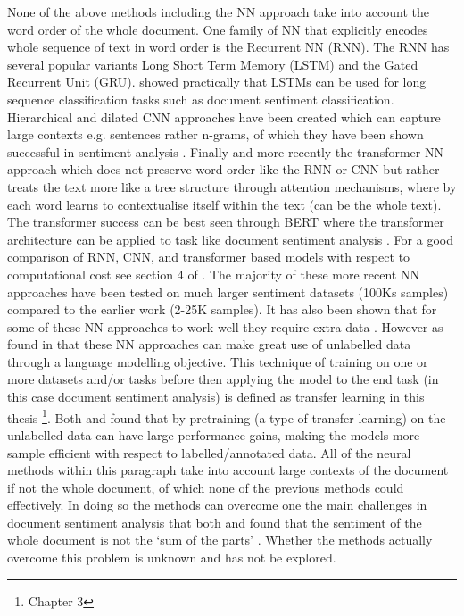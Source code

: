 None of the above methods including the NN approach take into account the word order of the whole document. One family of NN that explicitly encodes whole sequence of text in word order is the Recurrent NN (RNN). The RNN has several popular variants Long Short Term Memory (LSTM) and the Gated Recurrent Unit (GRU). \citet{dai2015semi} showed practically that LSTMs can be used for long sequence classification tasks such as document sentiment classification. Hierarchical \citep{zhang2015character} and dilated \citep{strubell-etal-2017-fast} CNN approaches have been created which can capture large contexts e.g. sentences rather n-grams, of which they have been shown successful in sentiment analysis \citep{conneau-etal-2017-deep}. Finally and more recently the transformer NN \citep{vaswani2017attention} approach which does not preserve word order like the RNN or CNN but rather treats the text more like a tree structure through attention mechanisms, where by each word learns to contextualise itself within the text (can be the whole text). The transformer success can be best seen through BERT \citep{devlin-etal-2019-bert} where the transformer architecture can be applied to task like document sentiment analysis \citep{sun2019fine}. For a good comparison of RNN, CNN, and transformer based models with respect to computational cost see section 4 of \citet{vaswani2017attention}. The majority of these more recent NN approaches have been tested on much larger sentiment datasets (100Ks samples) compared to the earlier work (2-25K samples). It has also been shown that for some of these NN approaches to work well they require extra data \citep{dai2015semi}. However as found in \citet{dai2015semi} that these NN approaches can make great use of unlabelled data through a language modelling objective. This technique of training on one or more datasets and/or tasks before then applying the model to the end task (in this case document sentiment analysis) is defined as transfer learning in this thesis \citep{ruder2019neural}\footnote{Chapter 3}.  Both \citet{howard-ruder-2018-universal} and \citet{sun2019fine} found that by pretraining (a type of transfer learning) on the unlabelled data can have large performance gains, making the models more sample efficient with respect to labelled/annotated data. All of the neural methods within this paragraph take into account large contexts of the document if not the whole document, of which none of the previous methods could effectively. In doing so the methods can overcome one the main challenges in document sentiment analysis that both \citet{turney-2002-thumbs} and \citet{pang-etal-2002-thumbs} found that the sentiment of the whole document is not the `sum of the parts' \citep{turney-2002-thumbs}. Whether the methods actually overcome this problem is unknown and has not be explored.


